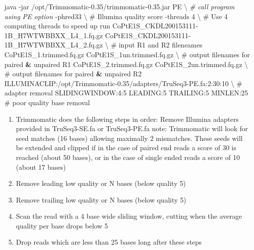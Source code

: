 \documentclass[]{article}
\newenvironment{Shaded}{\begin{snugshade}}{\end{snugshade}}
\newcommand{\CommentTok}[1]{\textcolor[rgb]{0.56,0.35,0.01}{\textit{#1}}}
\newcommand{\DataTypeTok}[1]{\textcolor[rgb]{0.13,0.29,0.53}{#1}}
\newcommand{\ExtensionTok}[1]{#1}
\newcommand{\KeywordTok}[1]{\textcolor[rgb]{0.13,0.29,0.53}{\textbf{#1}}}
\newcommand{\NormalTok}[1]{#1}
\providecommand{\tightlist}{%
  \setlength{\itemsep}{0pt}\setlength{\parskip}{0pt}}
\begin{document}
\begin{Shaded}
\begin{Highlighting}[]
\ExtensionTok{java}\NormalTok{ -jar /opt/Trimmomatic-0.35/trimmomatic-0.35.jar PE }\DataTypeTok{\textbackslash{} } \CommentTok{# call program using PE option}
\ExtensionTok{-phred33} \DataTypeTok{\textbackslash{} }\NormalTok{                                                # Illumina quality score}
\ExtensionTok{-threads}\NormalTok{ 4 }\DataTypeTok{\textbackslash{} }\NormalTok{                                              # Use 4 computing threads to speed up run}
\ExtensionTok{CoPtE1S_CKDL200153111-1B_H7WTWBBXX_L4_1.fq.gz}\NormalTok{ CoPtE1S_CKDL200153111-1B_H7WTWBBXX_L4_2.fq.gz  }\DataTypeTok{\textbackslash{} }\NormalTok{                                   # input R1 and R2 fileneames}
\ExtensionTok{CoPtE1S_1.trimmed.fq.gz}\NormalTok{ CoPtE1S_1un.trimmed.fq.gz }\DataTypeTok{\textbackslash{} }\NormalTok{  # output filenames for paired }\KeywordTok{&} \ExtensionTok{unpaired}\NormalTok{ R1}
\ExtensionTok{CoPtE1S_2.trimmed.fq.gz}\NormalTok{ CoPtE1S_2un.trimmed.fq.gz }\DataTypeTok{\textbackslash{} }\NormalTok{  # output filenames for paired }\KeywordTok{&} \ExtensionTok{unpaired}\NormalTok{ R2}
\ExtensionTok{ILLUMINACLIP}\NormalTok{:/opt/Trimmomatic-0.35/adapters/TruSeq3-PE.fa:2:30:10 }\DataTypeTok{\textbackslash{} }\NormalTok{  # adapter removal}
\ExtensionTok{SLIDINGWINDOW}\NormalTok{:4:5 LEADING:5 TRAILING:5 MINLEN:25           # poor quality base removal}
\end{Highlighting}
\end{Shaded}

\begin{enumerate}
\def\labelenumi{\arabic{enumi}.}
\tightlist
\item
  Trimmomatic does the following steps in order: Remove Illumina
  adapters provided in TruSeq3-SE.fa or TruSeq3-PE.fa note: Trimmomatic
  will look for seed matches (16 bases) allowing maximally 2 mismatches.
  These seeds will be extended and clipped if in the case of paired end
  reads a score of 30 is reached (about 50 bases), or in the case of
  single ended reads a score of 10 (about 17 bases)
\item
  Remove leading low quality or N bases (below quality 5)
\item
  Remove trailing low quality or N bases (below quality 5)
\item
  Scan the read with a 4 base wide sliding window, cutting when the
  average quality per base drops below 5
\item
  Drop reads which are less than 25 bases long after these steps
\end{enumerate}
\end{document}
